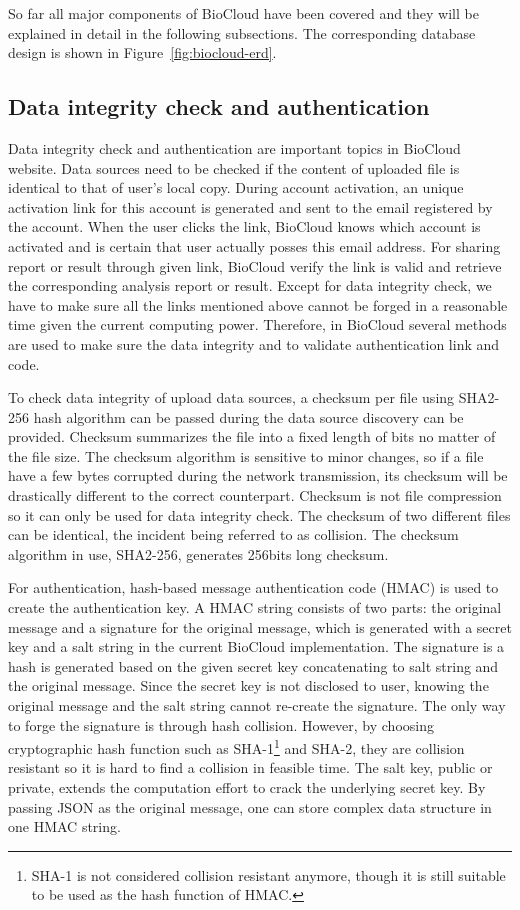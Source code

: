 

So far all major components of BioCloud have been covered and they will be
explained in detail in the following subsections. The corresponding database
design is shown in Figure~\ref{fig:biocloud-erd}.


\subsection{Data integrity check and authentication}

Data integrity check and authentication are important topics in BioCloud
website. Data sources need to be checked if the content of uploaded file is
identical to that of user's local copy. During account activation, an unique
activation link for this account is generated and sent to the email registered
by the account. When the user clicks the link, BioCloud knows which account is
activated and is certain that user actually posses this email address. For
sharing report or result through given link, BioCloud verify the link is valid
and retrieve the corresponding analysis report or result. Except for data
integrity check, we have to make sure all the links mentioned above cannot be
forged in a reasonable time given the current computing power. Therefore, in
BioCloud several methods are used to make sure the data integrity and to
validate authentication link and code.

To check data integrity of upload data sources, a checksum per file using
SHA2-256 hash algorithm can be passed during the data source discovery can be
provided. Checksum summarizes the file into a fixed length of bits no matter of
the file size. The checksum algorithm is sensitive to minor changes, so if a
file have a few bytes corrupted during the network transmission, its checksum
will be drastically different to the correct counterpart. Checksum is not file
compression so it can only be used for data integrity check. The checksum of
two different files can be identical, the incident being referred to as
collision. The checksum algorithm in use, SHA2-256, generates 256bits long
checksum.

For authentication, hash-based message authentication code (HMAC) is used to
create the authentication key. A HMAC string consists of two parts: the
original message and a signature for the original message, which is generated
with a secret key and a salt string in the current BioCloud implementation. The
signature is a hash is generated based on the given secret key concatenating to
salt string and the original message. Since the secret key is not disclosed to
user, knowing the original message and the salt string cannot re-create the
signature. The only way to forge the signature is through hash collision.
However, by choosing cryptographic hash function such as SHA-1\footnote{
    SHA-1 is not considered collision resistant anymore, though it is still
    suitable to be used as the hash function of HMAC.
} and SHA-2, they are collision resistant so it is hard to find a collision
in feasible time. The salt key, public or private, extends the computation
effort to crack the underlying secret key. By passing JSON as the original
message, one can store complex data structure in one HMAC string.


